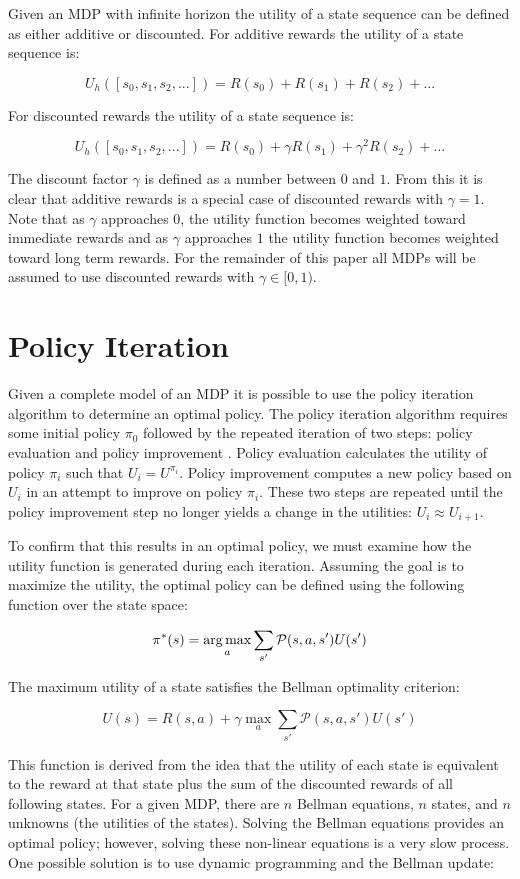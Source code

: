Given an MDP with infinite horizon the utility of a state sequence can be defined as either additive or discounted. For additive rewards the utility of a state sequence is:

\[
    U_h([s_0,s_1,s_2,...]) = R(s_0) + R(s_1) + R(s_2) + ...
\]

For discounted rewards the utility of a state sequence is:

\[
    U_h([s_0,s_1,s_2,...]) = R(s_0) + \gamma R(s_1) + \gamma^2 R(s_2) + ...
\]

The discount factor $\gamma$ is defined as a number between $0$ and $1$. From this it is clear that additive rewards is a special case of discounted rewards with $\gamma = 1$.  Note that as $\gamma$ approaches $0$, the utility function becomes weighted toward immediate rewards and as $\gamma$ approaches $1$ the utility function becomes weighted toward long term rewards. For the remainder of this paper all MDPs will be assumed to use discounted rewards with $\gamma \in [0, 1)$.

\section{Policy Iteration}

Given a complete model of an MDP it is possible to use the policy iteration algorithm to determine an optimal policy. The policy iteration algorithm requires some initial policy $\pi_0$ followed by the repeated iteration of two steps: policy evaluation and policy improvement \cite{norvig}. Policy evaluation calculates the utility of policy $\pi_i$ such that $U_i = U^{\pi_i}$. Policy improvement computes a new policy based on $U_i$ in an attempt to improve on policy $\pi_i$. These two steps are repeated until the policy improvement step no longer yields a change in the utilities: $U_i \approx U_{i+1}$.

To confirm that this results in an optimal policy, we must examine how the utility function is generated during each iteration. Assuming the goal is to maximize the utility, the optimal policy can be defined using the following function over the state space:

\[
    \pi^*(s) = \operatorname*{arg\,max}_a \sum_{s'} \mathcal{P}(s,a,s')U(s')
\]

The maximum utility of a state satisfies the Bellman optimality criterion:

\[
    U(s) = R(s,a) + \gamma \max_a \sum_{s'}\mathcal{P}(s,a,s')U(s')
\]

This function is derived from the idea that the utility of each state is equivalent to the reward at that state plus the sum of the discounted rewards of all following states. For a given MDP, there are $n$ Bellman equations, $n$ states, and $n$ unknowns (the utilities of the states). Solving the Bellman equations provides an optimal policy; however, solving these non-linear equations is a very slow process. One possible solution is to use dynamic programming and the Bellman update:

